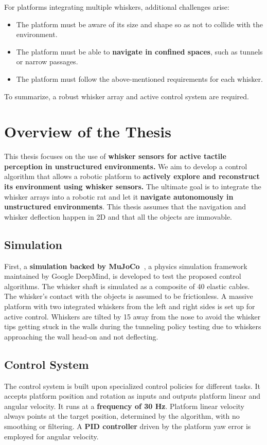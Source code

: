 For platforms integrating multiple whiskers, additional challenges arise:
\begin{itemize}
    \item The platform must be aware of its size and shape so as not to collide with the environment.
    \item The platform must be able to \textbf{navigate in confined spaces}, such as tunnels or narrow passages.
    \item The platform must follow the above-mentioned requirements for each whisker.
\end{itemize}

To summarize, a robust whisker array and active control system are required.


\section{Overview of the Thesis}

This thesis focuses on the use of \textbf{whisker sensors for active tactile perception in unstructured environments.}
We aim to develop a control algorithm that allows a robotic platform to \textbf{actively explore and reconstruct its environment using whisker sensors.}
The ultimate goal is to integrate the whisker arrays into a robotic rat and let it \textbf{navigate autonomously in unstructured environments}.
This thesis assumes that the navigation and whisker deflection happen in 2D and that all the objects are immovable.

\subsection{Simulation}
First, a \textbf{simulation backed by MuJoCo~\cite{todorov2012mujoco}}, a physics simulation framework maintained by Google DeepMind, is developed to test the proposed control algorithms.
The whisker shaft is simulated as a composite of 40 elastic cables.
The whisker's contact with the objects is assumed to be frictionless.
A massive platform with two integrated whiskers from the left and right sides is set up for active control.
Whiskers are tilted by 15\degree{} away from the nose to avoid the whisker tips getting stuck in the walls during the tunneling policy testing due to whiskers approaching the wall head-on and not deflecting.

\subsection{Control System}
The control system is built upon specialized control policies for different tasks.
It accepts platform position and rotation as inputs and outputs platform linear and angular velocity.
It runs at a \textbf{frequency of 30 Hz}.
Platform linear velocity always points at the target position, determined by the algorithm, with no smoothing or filtering.
A \textbf{PID controller} driven by the platform yaw error is employed for angular velocity.

